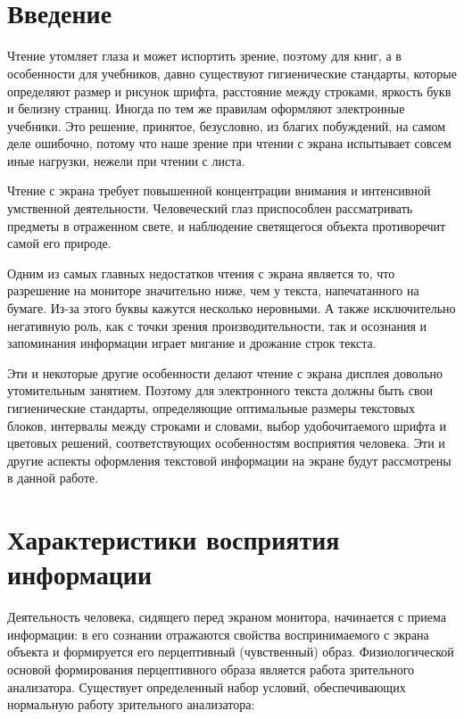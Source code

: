\documentclass[14pt]{extarticle}
\begin{document}
\title{\\ }
\maketitle

\section{Введение}

Чтение утомляет глаза и может испортить зрение, поэтому для книг, а в особенности для учебников, давно существуют гигиенические стандарты, которые определяют размер и рисунок шрифта, расстояние между строками, яркость букв и белизну страниц. Иногда по тем же правилам оформляют электронные учебники. Это решение, принятое, безусловно, из благих побуждений, на самом деле ошибочно, потому что наше зрение при чтении с экрана испытывает совсем иные нагрузки, нежели при чтении с листа.

Чтение с экрана требует повышенной концентрации внимания и интенсивной умственной деятельности. Человеческий глаз приспособлен рассматривать предметы в отраженном свете, и наблюдение светящегося объекта противоречит самой его природе.

Одним из самых главных недостатков чтения с экрана является то, что разрешение на мониторе значительно ниже, чем у текста, напечатанного на бумаге. Из-за этого буквы кажутся несколько неровными. А также исключительно негативную роль, как с точки зрения производительности, так и осознания и запоминания информации играет мигание и дрожание строк текста.

Эти и некоторые другие особенности делают чтение с экрана дисплея довольно утомительным занятием. Поэтому для электронного текста должны быть свои гигиенические стандарты, определяющие оптимальные размеры текстовых блоков, интервалы между строками и словами, выбор удобочитаемого шрифта и цветовых решений, соответствующих особенностям восприятия человека. Эти и другие аспекты оформления текстовой информации на экране будут рассмотрены в данной работе.

\section{Характеристики восприятия информации}

Деятельность человека, сидящего перед экраном монитора, начинается с приема информации: в его сознании отражаются свойства воспринимаемого с экрана объекта и формируется его перцептивный (чувственный) образ. Физиологической основой формирования перцептивного образа является работа зрительного анализатора. Существует определенный набор условий, обеспечивающих нормальную работу зрительного анализатора:
\end{document}
